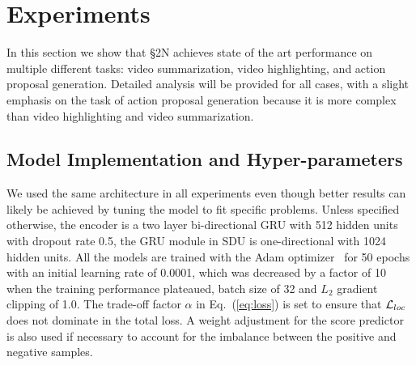\documentclass[10pt,journal,compsoc]{IEEEtran}
\begin{document}


\section{Experiments}

In this section we show that \S2N achieves state of the art performance on multiple different tasks: video summarization, video highlighting, and action proposal generation. Detailed analysis will be provided for all cases, with a slight emphasis on the task of action proposal generation because it is more complex than video highlighting and video summarization. 

\subsection{Model Implementation and Hyper-parameters}
We used the same architecture in all experiments even though better results can likely be achieved by tuning the model to fit specific problems. 
Unless specified otherwise, the encoder is a two layer bi-directional GRU with 512 hidden units with dropout rate 0.5, the GRU module in SDU is one-directional with 1024 hidden units. All the models are trained with the Adam optimizer~\cite{kingma2014adam} for 50 epochs with an initial learning rate of 0.0001, which was decreased by a factor of 10 when the training performance plateaued, batch size of 32 and $L_2$ gradient clipping of 1.0. The trade-off factor $\alpha$ in Eq.~(\ref{eq:loss}) is set to ensure that $\mathcal{L}_{loc}$ does not dominate in the total loss. 
A weight adjustment for the score predictor is also used if necessary to account for the imbalance between the positive and negative samples. 

\end{document}
